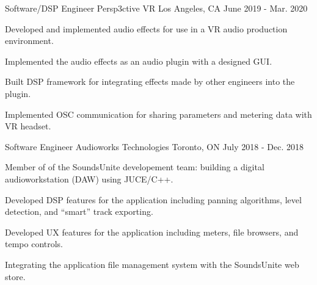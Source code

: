 \begin{cventries}
  \cventry
    {Software/DSP Engineer} %
    {Persp3ctive VR} %
    {Los Angeles, CA} %
    {June 2019 - Mar. 2020} %
    {
      \begin{cvitems} %
        \item {Developed and implemented audio effects for use in a VR audio production environment.}
        \item {Implemented the audio effects as an audio plugin with a designed GUI.}
        \item {Built DSP framework for integrating effects made by other engineers into the plugin.}
        \item {Implemented OSC communication for sharing parameters and metering data with VR headset.}
      \end{cvitems}
    }

  \cventry
    {Software Engineer} %
    {Audioworks Technologies} %
    {Toronto, ON} %
    {July 2018 - Dec. 2018} %
    {
      \begin{cvitems} %
        \item {Member of of the SoundsUnite developement team: building a digital audioworkstation (DAW) using JUCE/C++.}
        \item {Developed DSP features for the application including panning algorithms, level detection, and ``smart'' track exporting.}
        \item {Developed UX features for the application including meters, file browsers, and tempo controls.}
        \item {Integrating the application file management system with the SoundsUnite web store.}
      \end{cvitems}
    }


\end{cventries}
